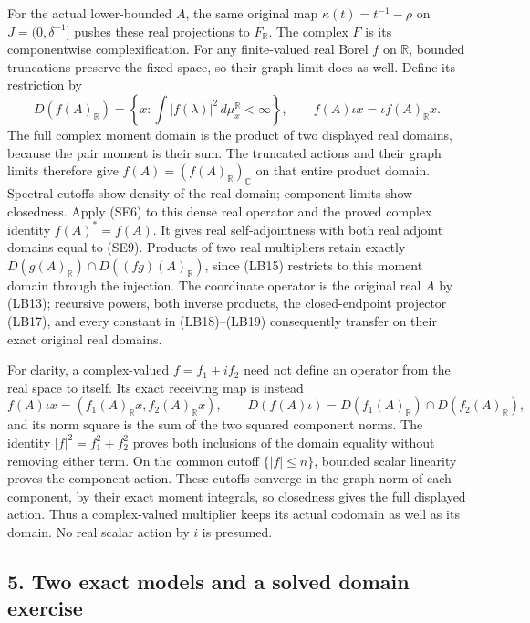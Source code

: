 \documentclass[
  11pt,
]{article}
\begin{document}
For the actual lower-bounded \(A\), the same original map
\(\kappa(t)=t^{-1}-\rho\) on \(J=(0,\delta^{-1}]\) pushes these real
projections to \(F_{\mathbb R}\). The complex \(F\) is its componentwise
complexification. For any finite-valued real Borel \(f\) on
\(\mathbb R\), bounded truncations preserve the fixed space, so their
graph limit does as well. Define its restriction by \[
 D(f(A)_{\mathbb R})=\left\{x:\int |f(\lambda)|^2\,d\mu_x^{\mathbb R}<\infty\right\},
 \qquad f(A)\iota x=\iota f(A)_{\mathbb R}x.
 \tag{SE9}
\] The full complex moment domain is the product of two displayed real
domains, because the pair moment is their sum. The truncated actions and
their graph limits therefore give
\(f(A)=(f(A)_{\mathbb R})_{\mathbb C}\) on that entire product domain.
Spectral cutoffs show density of the real domain; component limits show
closedness. Apply (SE6) to this dense real operator and the proved
complex identity \(f(A)^*=f(A)\). It gives real self-adjointness with
both real adjoint domains equal to (SE9). Products of two real
multipliers retain exactly
\(D(g(A)_{\mathbb R})\cap D((fg)(A)_{\mathbb R})\), since (LB15)
restricts to this moment domain through the injection. The coordinate
operator is the original real \(A\) by (LB13); recursive powers, both
inverse products, the closed-endpoint projector (LB17), and every
constant in (LB18)--(LB19) consequently transfer on their exact original
real domains.

For clarity, a complex-valued \(f=f_1+if_2\) need not define an operator
from the real space to itself. Its exact receiving map is instead \[
 f(A)\iota x=(f_1(A)_{\mathbb R}x,f_2(A)_{\mathbb R}x),\qquad
 D(f(A)\iota)=D(f_1(A)_{\mathbb R})\cap D(f_2(A)_{\mathbb R}),
 \tag{SE10}
\] and its norm square is the sum of the two squared component norms.
The identity \(|f|^2=f_1^2+f_2^2\) proves both inclusions of the domain
equality without removing either term. On the common cutoff
\(\{|f|\leq n\}\), bounded scalar linearity proves the component action.
These cutoffs converge in the graph norm of each component, by their
exact moment integrals, so closedness gives the full displayed action.
Thus a complex-valued multiplier keeps its actual codomain as well as
its domain. No real scalar action by \(i\) is presumed.

\subsection{5. Two exact models and a solved domain
exercise}\label{two-exact-models-and-a-solved-domain-exercise}
\end{document}
